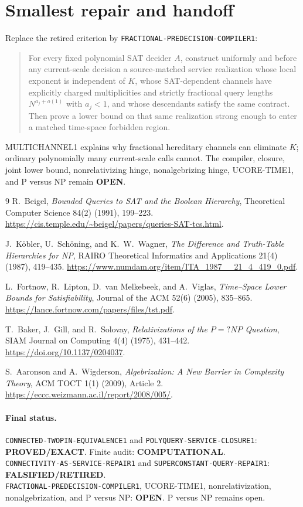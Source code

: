 \documentclass[11pt]{article}
\newcommand{\EXACT}{\textbf{PROVED/EXACT}}
\newcommand{\OPEN}{\textbf{OPEN}}
\newcommand{\RETIRED}{\textbf{FALSIFIED/RETIRED}}
\newcommand{\COMP}{\textbf{COMPUTATIONAL}}
\begin{document}
\section{Smallest repair and handoff}

Replace the retired criterion by
\texttt{FRACTIONAL-PREDECISION-COMPILER1}:
\begin{quote}
For every fixed polynomial SAT decider $A$, construct uniformly and before
any current-scale decision a source-matched service realization whose local
exponent is independent of $K$, whose SAT-dependent channels have explicitly
charged multiplicities and strictly fractional query lengths $N^{a_j+o(1)}$
with $a_j<1$, and whose descendants satisfy the same contract.  Then prove a
lower bound on that same realization strong enough to enter a matched
time-space forbidden region.
\end{quote}
MULTICHANNEL1 explains why fractional hereditary channels can eliminate $K$;
ordinary polynomially many current-scale calls cannot.  The compiler, closure,
joint lower bound, nonrelativizing hinge, nonalgebrizing hinge, UCORE-TIME1,
and P versus NP remain \OPEN.

\begin{thebibliography}{9}
R.~Beigel,
\emph{Bounded Queries to SAT and the Boolean Hierarchy},
Theoretical Computer Science 84(2) (1991), 199--223.
\url{https://cis.temple.edu/~beigel/papers/queries-SAT-tcs.html}.

J.~K\"obler, U.~Sch\"oning, and K.~W.~Wagner,
\emph{The Difference and Truth-Table Hierarchies for NP},
RAIRO Theoretical Informatics and Applications 21(4) (1987), 419--435.
\url{https://www.numdam.org/item/ITA_1987__21_4_419_0.pdf}.

L.~Fortnow, R.~Lipton, D.~van Melkebeek, and A.~Viglas,
\emph{Time--Space Lower Bounds for Satisfiability},
Journal of the ACM 52(6) (2005), 835--865.
\url{https://lance.fortnow.com/papers/files/tst.pdf}.

T.~Baker, J.~Gill, and R.~Solovay,
\emph{Relativizations of the $P=?NP$ Question},
SIAM Journal on Computing 4(4) (1975), 431--442.
\url{https://doi.org/10.1137/0204037}.

S.~Aaronson and A.~Wigderson,
\emph{Algebrization: A New Barrier in Complexity Theory},
ACM TOCT 1(1) (2009), Article 2.
\url{https://eccc.weizmann.ac.il/report/2008/005/}.
\end{thebibliography}

\paragraph{Final status.}
\nolinkurl{CONNECTED-TWOPIN-EQUIVALENCE1} and
\nolinkurl{POLYQUERY-SERVICE-CLOSURE1}: \EXACT.  Finite audit: \COMP.\\
\nolinkurl{CONNECTIVITY-AS-SERVICE-REPAIR1} and
\nolinkurl{SUPERCONSTANT-QUERY-REPAIR1}: \RETIRED.\\
\nolinkurl{FRACTIONAL-PREDECISION-COMPILER1}, UCORE-TIME1,
nonrelativization, nonalgebrization, and P versus NP: \OPEN.
P versus NP remains open.

\end{document}

